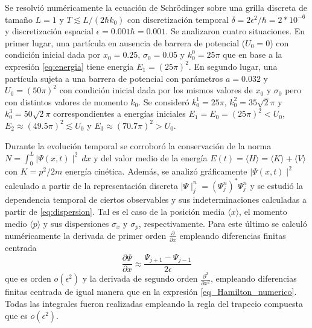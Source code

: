 \documentclass[aps,prb,twocolumn,superscriptaddress,floatfix,longbibliography]{revtex4-2}
\newif\ifptitle
\newif\ifpnumber
\newcounter{para}
\newcommand\ptitle[1]{\par\refstepcounter{para}
{\ifpnumber{\noindent\textcolor{lightgray}{\textbf{\thepara}}\indent}\fi}
{\ifptitle{\textbf{[{#1}]}}\fi}}
\begin{document}
Se resolvió numéricamente la ecuación de Schrödinger sobre una grilla discreta de tamaño $L = 1$ y $T \lesssim L/(2 \hbar k_0)$ con discretización temporal $\delta = 2 \epsilon^2 / \hbar = 2*10^{-6}$ y discretización espacial  $\epsilon = 0.001 \hbar = 0.001$. Se analizaron cuatro situaciones. En primer lugar, una partícula en ausencia de barrera de potencial ($U_0 = 0$) con condición inicial dada por $x_0 = 0.25$, $\sigma_0 = 0.05$ y $k_0^0 = 25 \pi$ que en base a la expresión \ref{eq:energia} tiene energía $E_1 = (25 \pi)^2$. En segundo lugar, una partícula sujeta a una barrera de potencial con parámetros $a = 0.032$ y $U_0 = (50 \pi)^2$ con condición inicial dada por los mismos valores de $x_0$ y $\sigma_0$ pero con distintos valores de momento $k_0$. Se consideró $k_0^1 = 25 \pi$, $k_0^2 = 35 \sqrt{2} \pi$ y $k_0^3 = 50 \sqrt{2} \pi$ correspondientes a energías iniciales $E_1 = E_0 = (25 \pi)^2 < U_0$, $E_2 \approx (49.5 \pi)^2 \lesssim U_0$ y $E_3 \approx (70.7 \pi)^2 > U_0$.

\ptitle{Cálculo de esperanzas: fórmula gral y aproximaciones usadas para calcular p y $p^2$.}

Durante la evolución temporal se corroboró la conservación de la norma $N = \int_0^L{\mid \Psi(x,t) \mid^2} \, dx$ y del valor medio de la energía $E(t) = \langle H \rangle = \langle K \rangle + \langle V \rangle$ con $K = p^2/2m$ energía cinética. Además, se analizó gráficamente $\mid \Psi(x,t) \mid^2$ calculado a partir de la representación discreta $\mid \Psi \mid_{j}^n = (\Psi_j^n)^* \Psi_j^n$ y se estudió la dependencia temporal de ciertos observables y sus indeterminaciones calculadas a partir de \ref{eq:dispersion}. Tal es el caso de la posición media $\langle x \rangle$, el momento medio $\langle p \rangle$ y sus dispersiones $\sigma_x$ y $\sigma_p$, respectivamente. Para este último se calculó numéricamente la derivada de primer orden $\frac{\partial}{\partial x}$ empleando diferencias finitas centrada
\[\frac{\partial \Psi}{\partial x} \approx \frac{ \Psi_{j+1} - \Psi_{j-1}}{2 \epsilon}\]
que es orden $o(\epsilon^2)$ y la derivada de segundo orden $\frac{\partial^2}{\partial x^2}$, empleando diferencias finitas centrada de igual manera que en la expresión \ref{eq_Hamilton_numerico}. Todas las integrales fueron realizadas empleando la regla del trapecio compuesta que es $o(\epsilon^2)$.

\end{document}
